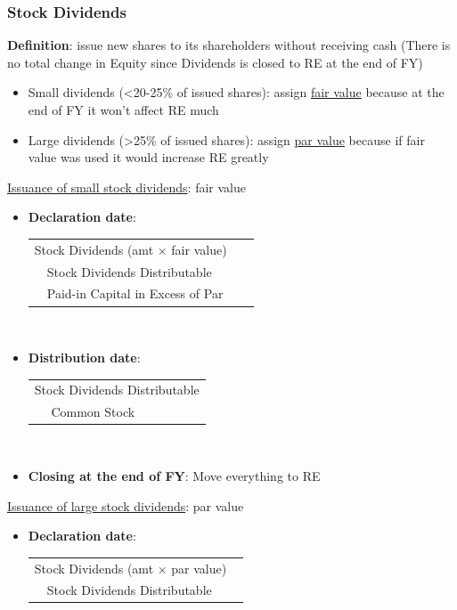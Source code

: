 \documentclass{article}
\begin{document}
\begin{multicols}{2}
\subsubsection{Stock Dividends}
\textbf{Definition}: issue new shares to its shareholders without receiving cash (There is no total change in Equity since Dividends is closed to RE at the end of FY)
\begin{itemize}
	\item Small dividends (<20-25\% of issued shares): assign \underline{fair value} because at the end of FY it won't affect RE much
	\item Large dividends (>25\% of issued shares): assign \underline{par value} because if fair value was used it would increase RE greatly
\end{itemize}
\underline{Issuance of small stock dividends}: fair value
\begin{itemize}
	\item \textbf{Declaration date}:\vspace{0.5em}\\
	\begin{tabular}{llll}
		\multicolumn{4}{l}{Stock Dividends (amt $\times$ fair value)}\\
		& Stock Dividends Distributable & &\\
		& Paid-in Capital in Excess of Par& &
	\end{tabular}\vspace{0.5em}\\

	\item \textbf{Distribution date}:\vspace{0.5em}\\
	\begin{tabular}{llll}
		\multicolumn{4}{l}{Stock Dividends Distributable}\\
		& Common Stock& &
	\end{tabular}\vspace{0.5em}\\
\item \textbf{Closing at the end of FY}: Move everything to RE
\end{itemize}
\underline{Issuance of large stock dividends}: par value
\begin{itemize}
	\item \textbf{Declaration date}:\vspace{0.5em}\\
	\begin{tabular}{llll}
		\multicolumn{4}{l}{Stock Dividends (amt $\times$ par value)}\\
		& Stock Dividends Distributable & &\\
	\end{tabular}\vspace{0.5em}\\


\end{itemize}
\end{multicols}
\end{document}
